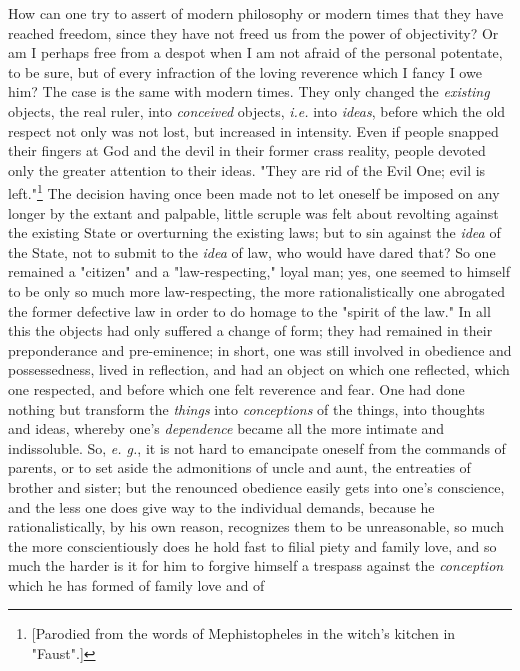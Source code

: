 How can one try to assert of modern philosophy or modern times that they have 
reached freedom, since they have not freed us from the power of objectivity? 
Or am I perhaps free from a despot when I am not afraid of the personal 
potentate, to be sure, but of every infraction of the loving reverence which I 
fancy I owe him? The case is the same with modern times. They only changed the 
\textit{existing} objects, the real ruler, into \textit{conceived} objects, 
\textit{i.e.} into \textit{ideas}, before which the old respect not only was 
not lost, but increased in intensity. Even if people snapped their fingers at 
God and the devil in their former crass reality, people devoted only the 
greater attention to their ideas. "{}They are rid of the Evil One; evil is 
left."{}\footnote{[Parodied from the words of Mephistopheles in the witch's 
kitchen in "{}Faust"{}.]} The decision having once been made not to let 
oneself be imposed on any longer by the extant and palpable, little scruple 
was felt about revolting against the existing State or overturning the 
existing laws; but to sin against the \textit{idea} of the State, not to 
submit to the \textit{idea} of law, who would have dared that? So one remained 
a "{}citizen"{} and a "{}law-respecting,"{} loyal man; yes, one seemed to 
himself to be only so much more law-respecting, the more rationalistically one 
abrogated the former defective law in order to do homage to the "{}spirit of 
the law."{} In all this the objects had only suffered a change of form; they 
had remained in their preponderance and pre-eminence; in short, one was still 
involved in obedience and possessedness, lived in reflection, and had an 
object on which one reflected, which one respected, and before which one felt 
reverence and fear. One had done nothing but transform the \textit{things} 
into \textit{conceptions} of the things, into thoughts and ideas, whereby 
one's \textit{dependence} became all the more intimate and indissoluble. So, 
\textit{e. g.}, it is not hard to emancipate oneself from the commands of 
parents, or to set aside the admonitions of uncle and aunt, the entreaties of 
brother and sister; but the renounced obedience easily gets into one's 
conscience, and the less one does give way to the individual demands, because 
he rationalistically, by his own reason, recognizes them to be unreasonable, 
so much the more conscientiously does he hold fast to filial piety and family 
love, and so much the harder is it for him to forgive himself a trespass 
against the \textit{conception} which he has formed of family love and of 

